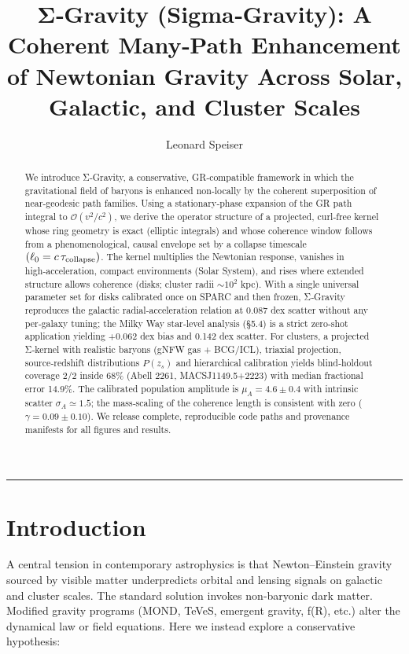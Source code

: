 \documentclass[11pt,a4paper]{article}
\begin{document}
\title{Σ‑Gravity (Sigma‑Gravity): A Coherent Many‑Path Enhancement of Newtonian Gravity Across Solar, Galactic, and Cluster Scales}

\author{Leonard Speiser}

\date{}

\maketitle

\medskip\hrule\medskip


\begin{abstract}
We introduce Σ‑Gravity, a conservative, GR‑compatible framework in which the gravitational field of baryons is enhanced non‑locally by the coherent superposition of near‑geodesic path families. Using a stationary‑phase expansion of the GR path integral to $\mathcal{O}(v^2/c^2)$, we derive the operator structure of a projected, curl‑free kernel whose ring geometry is exact (elliptic integrals) and whose coherence window follows from a phenomenological, causal envelope set by a collapse timescale $(\ell_0 = c\,\tau_{\rm collapse})$. The kernel multiplies the Newtonian response, vanishes in high‑acceleration, compact environments (Solar System), and rises where extended structure allows coherence (disks; cluster radii $\sim 10^2$ kpc).
With a single universal parameter set for disks calibrated once on SPARC and then frozen, Σ‑Gravity reproduces the galactic radial‑acceleration relation at 0.087 dex scatter without any per‑galaxy tuning; the Milky Way star‑level analysis (§5.4) is a strict zero‑shot application yielding +0.062 dex bias and 0.142 dex scatter. For clusters, a projected Σ‑kernel with realistic baryons (gNFW gas + BCG/ICL), triaxial projection, source‑redshift distributions $P(z_s)$ and hierarchical calibration yields blind‑holdout coverage 2/2 inside 68\% (Abell 2261, MACSJ1149.5+2223) with median fractional error 14.9\%. The calibrated population amplitude is $\mu_A=4.6\pm 0.4$ with intrinsic scatter $\sigma_A\simeq 1.5$; the mass‑scaling of the coherence length is consistent with zero ($\gamma=0.09\pm 0.10$). We release complete, reproducible code paths and provenance manifests for all figures and results.
\end{abstract}

\section{Introduction}


A central tension in contemporary astrophysics is that Newton–Einstein gravity sourced by visible matter underpredicts orbital and lensing signals on galactic and cluster scales. The standard solution invokes non‑baryonic dark matter. Modified gravity programs (MOND, TeVeS, emergent gravity, f(R), etc.) alter the dynamical law or field equations. Here we instead explore a conservative hypothesis:
\end{document}
